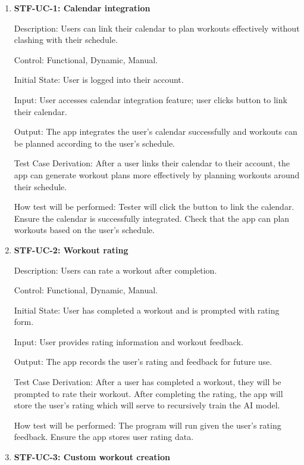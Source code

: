 \documentclass[12pt, titlepage]{article}
\begin{document}
\begin{enumerate}

\item{\textbf{STF-UC-1: Calendar integration}\\}

Description: Users can link their calendar to plan workouts effectively without clashing with their schedule.
	
Control: Functional, Dynamic, Manual.

Initial State: User is logged into their account.

Input: User accesses calendar integration feature; user clicks button to link their calendar.

Output: The app integrates the user’s calendar successfully and workouts can be planned according to the user’s schedule.

Test Case Derivation: After a user links their calendar to their account, the app can generate workout plans more effectively by planning workouts around their schedule.

How test will be performed: Tester will click the button to link the calendar. Ensure the calendar is successfully integrated. Check that the app can plan workouts based on the user’s schedule.

\item{\textbf{STF-UC-2: Workout rating}\\}

Description: Users can rate a workout after completion.
	
Control: Functional, Dynamic, Manual.

Initial State: User has completed a workout and is prompted with rating form.

Input: User provides rating information and workout feedback.

Output: The app records the user’s rating and feedback for future use. 

Test Case Derivation: After a user has completed a workout, they will be prompted to rate their workout. After completing the rating, the app will store the user’s rating which will serve to recursively train the AI model.

How test will be performed: The program will run given the user’s rating feedback. Ensure the app stores user rating data.
 
\item{\textbf{STF-UC-3: Custom workout creation}\\}


\end{enumerate}
\end{document}
